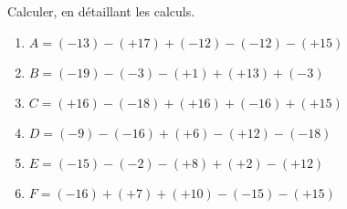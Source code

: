 \documentclass[8pt]{extarticle}
\begin{document}
\begin{exercice}[1]
Calculer, en détaillant les calculs.
\begin{multicols}{3}
\begin{enumerate}[label={}]
 \item  $ A =  (-13)-(+17)+(-12)-(-12)-(+15)$
\item  $ B =  (-19)-(-3)-(+1)+(+13)+(-3)$
   \item  $ C =  (+16)-(-18)+(+16)+(-16)+(+15)$
    \item  $ D =  (-9)-(-16)+(+6)-(+12)-(-18)$
\item  $ E =  (-15)-(-2)-(+8)+(+2)-(+12)$
\item  $ F =  (-16)+(+7)+(+10)-(-15)-(+15)$
           \end{enumerate}
  \end{multicols}
  \end{exercice}
\end{document}

